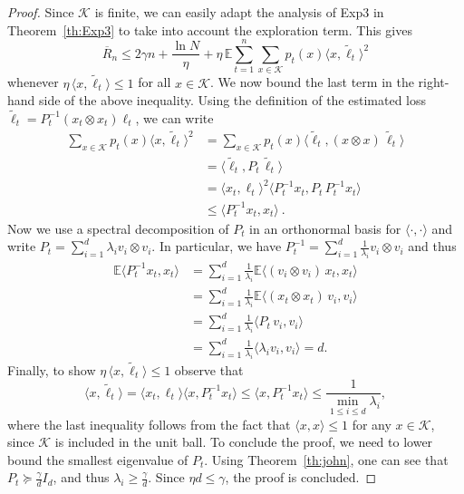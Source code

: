 \documentclass[11pt]{hackednow}
\newcommand{\E}{\mathbb{E}}
\newcommand{\R}{\mathbb{R}}
\newcommand{\cK}{\mathcal{K}}
\newcommand{\oR}{\overline{R}}
\renewcommand{\tilde}{\widetilde}
\begin{document}
\begin{proof}
Since $\cK$ is finite, we can easily adapt the analysis of Exp3 in Theorem~\ref{th:Exp3} to take into account the exploration term.
This gives
$$\oR_n \leq 2 \gamma n + \frac{\ln N}{\eta} + \eta\,\E \sum_{t=1}^n \sum_{x \in \cK} {p}_t(x) \langle x, \tilde{\ell}_t \rangle^2
$$
whenever
$\eta\,\langle x, \tilde{\ell}_t \rangle \leq 1$ for all $x \in \cK$. We now bound the last term in the right-hand side of the above inequality. Using the definition of the estimated loss $\tilde{\ell}_t = P_t^{-1} \left(x_t \otimes x_t\right) \ell_t$, we can write
\begin{align*}
    \sum_{x \in \cK} {p}_t(x) \langle x, \tilde{\ell}_t \rangle^2
&=
    \sum_{x \in \cK} {p}_t(x) \langle \tilde{\ell}_t, (x \otimes x)\,\tilde{\ell}_t \rangle
\\& =
    \langle \tilde{\ell}_t, P_t\,\tilde{\ell}_t \rangle 
\\&=
    \langle x_t, \ell_t \rangle^2 \langle P_t^{-1} x_t, P_t\, P_t^{-1} x_t\rangle
\\ &\le
    \langle P_t^{-1} x_t, x_t \rangle~.
\end{align*}
Now we use a spectral decomposition of $P_t$ in an orthonormal basis for $\langle \cdot, \cdot \rangle$ and write
$P_t = \sum_{i=1}^d \lambda_i v_i \otimes v_i $. In particular, we have $P_t^{-1} = \sum_{i=1}^d \frac{1}{\lambda_i} v_i \otimes v_i$ and thus
\begin{align*}
\E \langle P_t^{-1} x_t, x_t \rangle & = \sum_{i=1}^d \frac{1}{\lambda_i} \E \langle (v_i \otimes v_i)\, x_t, x_t \rangle \\
& = \sum_{i=1}^d \frac{1}{\lambda_i} \E \langle (x_t \otimes x_t)\, v_i, v_i \rangle \\
& = \sum_{i=1}^d \frac{1}{\lambda_i} \langle P_t\, v_i, v_i \rangle \\
& =  \sum_{i=1}^d \frac{1}{\lambda_i} \langle \lambda_i v_i, v_i \rangle
 =  d.
\end{align*}
Finally, to show $\eta\,\langle x, \tilde{\ell}_t \rangle \le 1$ observe that
$$
\langle x, \tilde{\ell}_t \rangle  =  \langle x_t, \ell_t \rangle \langle x, P_t^{-1} x_t \rangle
 \leq  \langle x, P_t^{-1} x_t \rangle
 \leq  \frac{1}{\min_{1 \leq i \leq d} \lambda_i} ,$$
where the last inequality follows from the fact that $\langle x, x \rangle \leq 1$ for any $x \in \cK$, since $\cK$ is included in the unit ball. To conclude the proof, we need to lower bound the smallest eigenvalue of $P_t$. Using Theorem~\ref{th:john}, one can see that $P_t \succeq \frac{\gamma}{d} I_d$, and thus $\lambda_i \geq \frac{\gamma}{d}$. Since ${\eta d} \le {\gamma}$, the proof is concluded.
\end{proof}
\end{document}
